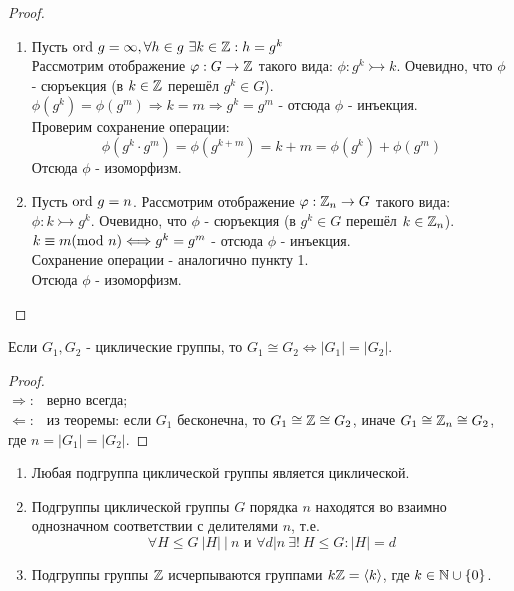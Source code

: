\begin{proof}\tab
    \begin{enumerate}
        \item Пусть $\textup{ord } g = \infty, \forall h \in g \ \exists k \in \mathbb{Z}: h = g^k$\\
        Рассмотрим отображение $\varphi: G \rightarrow \mathbb{Z}$ такого вида: $\phi: g^k \rightarrowtail k$. Очевидно, что $\phi$ - сюръекция (в $k\in \mathbb{Z}$ перешёл $g^k \in G$).\\
        $\phi(g^k) = \phi(g^m) \Longrightarrow k = m \Longrightarrow g^k = g^m$ - отсюда $\phi$ - инъекция.\\
        Проверим сохранение операции:
        \[\phi(g^k \cdot g^m) = \phi(g^{k+m}) = k+m = \phi(g^k) + \phi(g^m)\]
        Отсюда $\phi$ - изоморфизм.
        \item Пусть $\textup{ord } g = n$. Рассмотрим отображение $\varphi: \mathbb{Z}_n \rightarrow G$ такого вида: $\phi: k \rightarrowtail g^k$. Очевидно, что $\phi$ - сюръекция (в $g^k\in G$ перешёл $k \in \mathbb{Z}_n$).\\
        $k \equiv m (\textup{mod } n) \Longleftrightarrow g^k = g^m$ - отсюда $\phi$ - инъекция.\\
        Сохранение операции - аналогично пункту 1.\\ 
        Отсюда $\phi$ - изоморфизм.
    \end{enumerate}
\end{proof}
\begin{consequense}
    Если $G_1, G_2$ - циклические группы, то $G_1 \cong G_2 \Longleftrightarrow |G_1| = |G_2|$.
\end{consequense}
\begin{proof} \tab\\
    $\Longrightarrow : \ \ $ верно всегда;\\
    $\Longleftarrow : \ \ $ из теоремы: если $G_1$ бесконечна, то $G_1 \cong \mathbb{Z} \cong G_2$, иначе $G_1 \cong \mathbb{Z}_n \cong G_2$, где $n = |G_1| = |G_2|$.
\end{proof}
\begin{theoremnum} \tab
    \begin{enumerate}
        \item Любая подгруппа циклической группы является циклической.
        \item Подгруппы циклической группы $G$ порядка $n$ находятся во взаимно однозначном соответствии с делителями $n$, т.е.
        \[\forall H \leq G \ |H| \ |\  n \text{ и } \forall d | n \ \exists! \ H \leq G : |H| = d\]
        \item Подгруппы группы $\mathbb{Z}$ исчерпываются группами $k\mathbb{Z} =  \langle k \rangle$, где $k \in \mathbb{N} \cup \{0\}$.
    \end{enumerate}
\end{theoremnum}
